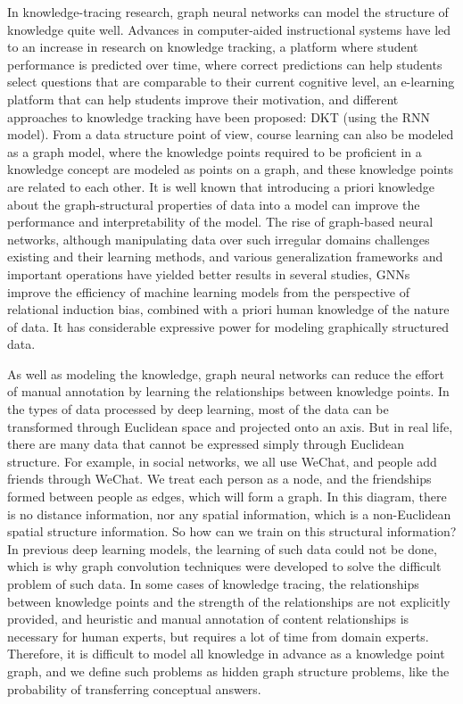 \documentclass[a4paper,11pt]{article}
\begin{document}
In knowledge-tracing research, graph neural networks can model the structure of knowledge quite well\cite{GKT}. Advances in computer-aided instructional systems have led to an increase in research on knowledge tracking, a platform where student performance is predicted over time, where correct predictions can help students select questions that are comparable to their current cognitive level, an e-learning platform that can help students improve their motivation, and different approaches to knowledge tracking have been proposed: DKT (using the RNN model)\cite{piech2015deep}. From a data structure point of view, course learning can also be modeled as a graph model, where the knowledge points required to be proficient in a knowledge concept are modeled as points on a graph, and these knowledge points are related to each other. It is well known that introducing a priori knowledge about the graph-structural properties of data into a model can improve the performance and interpretability of the model. The rise of graph-based neural networks, although manipulating data over such irregular domains challenges existing and their learning methods, and various generalization frameworks and important operations have yielded better results in several studies, GNNs improve the efficiency of machine learning models from the perspective of relational induction bias, combined with a priori human knowledge of the nature of data. It has considerable expressive power for modeling graphically structured data.

As well as modeling the knowledge, graph neural networks can reduce the effort of manual annotation by learning the relationships between knowledge points\cite{GKT}. In the types of data processed by deep learning, most of the data can be transformed through Euclidean space and projected onto an axis. But in real life, there are many data that cannot be expressed simply through Euclidean structure. For example, in social networks, we all use WeChat, and people add friends through WeChat. We treat each person as a node, and the friendships formed between people as edges, which will form a graph. In this diagram, there is no distance information, nor any spatial information, which is a non-Euclidean spatial structure information. So how can we train on this structural information? In previous deep learning models, the learning of such data could not be done, which is why graph convolution techniques were developed to solve the difficult problem of such data. In some cases of knowledge tracing, the relationships between knowledge points and the strength of the relationships are not explicitly provided, and heuristic and manual annotation of content relationships is necessary for human experts, but requires a lot of time from domain experts. Therefore, it is difficult to model all knowledge in advance as a knowledge point graph, and we define such problems as hidden graph structure problems, like the probability of transferring conceptual answers.
\end{document}
